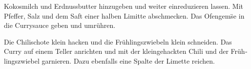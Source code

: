 \begin{otherlanguage}{ngerman}
\begin{recipe}
{      \step Kokosmilch und Erdnussbutter hinzugeben und weiter einreduzieren lassen. Mit Pfeffer, Salz und dem Saft einer halben Limitte abschmecken. Das Ofengem\"se in die Currysauce geben und umr\"uhren.

      \step Die Chilischote klein hacken und die Fr\"uhlingszwiebeln klein schneiden. Das Curry auf einem Teller anrichten und mit der kleingehackten Chili und der Fr\"uhlingszwiebel garnieren. Dazu ebenfalls eine Spalte der Limette reichen.
    }

    \hint
    {%
    }

\end{recipe}

\end{otherlanguage}
